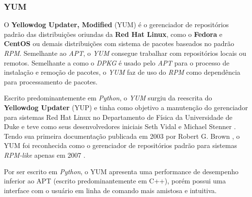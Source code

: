 \subsubsection{YUM} %
\label{ssub:yum}

O \textbf{Yellowdog Updater, Modified} (YUM) é o gerenciador de repositórios padrão  das distribuições oriundas da \textbf{Red Hat Linux}, como o \textbf{Fedora} e \textbf{CentOS} ou demais distribuições com sistema de pacotes baseados no padrão \textit{RPM}. Semelhante ao \textit{APT}, o \textit{YUM} consegue trabalhar com repositórios locais ou remotos.
Semelhante a como o \textit{DPKG} é usado pelo \textit{APT} para o processo de instalação e remoção de pacotes, o \textit{YUM} faz de uso do 	\textit{RPM} como dependência para processamento de pacotes.

Escrito predominantemente em \textit{Python}, o \textit{YUM} surgiu  da reescrita do \textbf{Yellowdog Updater} (YUP) e tinha como objetivo a manutenção do gerenciador para sistemas Red Hat Linux no Departamento de Física da Universidade de Duke e teve como seus desenvolvedores iniciais Seth Vidal e Michael Stenner \cite{yum-howto}. Tendo sua primeira documentação publicada em 2003 por Robert G. Brown \cite{yum_article}, o YUM foi reconhecida como o gerenciador de repositórios padrão para sistemas \textit{RPM-like} apenas em 2007 \cite{fusco2007linux}.

Por ser escrito em \textit{Python}, o YUM apresenta uma performance de desempenho inferior ao APT (escrito predominantemente em C++), porém possui uma interface com o usuário em linha de comando mais amistosa e intuitiva.